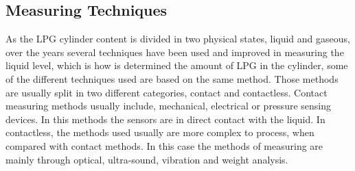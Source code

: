\subsection{Measuring Techniques}
As the LPG cylinder content is divided in two physical states, liquid and gaseous, over the years several techniques have been used and improved in measuring the liquid level, which is how is determined the amount of LPG in the cylinder, some of the different techniques used are based on the same method. Those methods are usually split in two different categories, contact and contactless. Contact measuring methods usually include, mechanical, electrical or pressure sensing devices. In this methods the sensors are in direct contact with the liquid. In contactless, the methods used usually are more complex to process, when compared with contact methods. In this case the methods of measuring are mainly through optical, ultra-sound, vibration and weight analysis\cite{nakagawaContactlessLiquidLevelMeasurement2013a}. 
